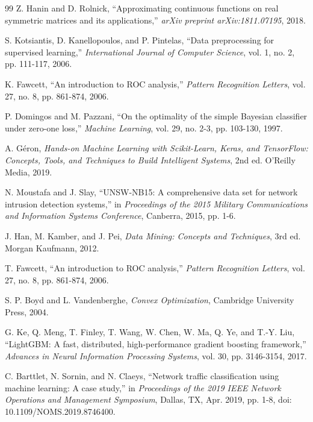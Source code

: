 \documentclass[conference]{IEEEtran}
\begin{document}
\begin{thebibliography}{99}
Z. Hanin and D. Rolnick,
``Approximating continuous functions on real symmetric matrices and its applications,''
\textit{arXiv preprint arXiv:1811.07195}, 2018.

S. Kotsiantis, D. Kanellopoulos, and P. Pintelas,
``Data preprocessing for supervised learning,''
\textit{International Journal of Computer Science}, vol. 1, no. 2, pp. 111-117, 2006.

K. Fawcett,
``An introduction to ROC analysis,''
\textit{Pattern Recognition Letters}, vol. 27, no. 8, pp. 861-874, 2006.

P. Domingos and M. Pazzani,
``On the optimality of the simple Bayesian classifier under zero-one loss,''
\textit{Machine Learning}, vol. 29, no. 2-3, pp. 103-130, 1997.

A. Géron,
\textit{Hands-on Machine Learning with Scikit-Learn, Keras, and TensorFlow: Concepts, Tools, and Techniques to Build Intelligent Systems},
2nd ed. O'Reilly Media, 2019.

N. Moustafa and J. Slay,
``UNSW-NB15: A comprehensive data set for network intrusion detection systems,''
in \textit{Proceedings of the 2015 Military Communications and Information Systems Conference}, Canberra, 2015, pp. 1-6.

J. Han, M. Kamber, and J. Pei,
\textit{Data Mining: Concepts and Techniques},
3rd ed. Morgan Kaufmann, 2012.

T. Fawcett,
``An introduction to ROC analysis,''
\textit{Pattern Recognition Letters}, vol. 27, no. 8, pp. 861-874, 2006.

S. P. Boyd and L. Vandenberghe,
\textit{Convex Optimization},
Cambridge University Press, 2004.

G. Ke, Q. Meng, T. Finley, T. Wang, W. Chen, W. Ma, Q. Ye, and T.-Y. Liu,
``LightGBM: A fast, distributed, high-performance gradient boosting framework,''
\textit{Advances in Neural Information Processing Systems}, vol. 30, pp. 3146-3154, 2017.

C. Barttlet, N. Sornin, and N. Claeys,
``Network traffic classification using machine learning: A case study,''
in \textit{Proceedings of the 2019 IEEE Network Operations and Management Symposium}, Dallas, TX, Apr. 2019, pp. 1-8, doi: 10.1109/NOMS.2019.8746400.

\end{thebibliography}
\end{document}
